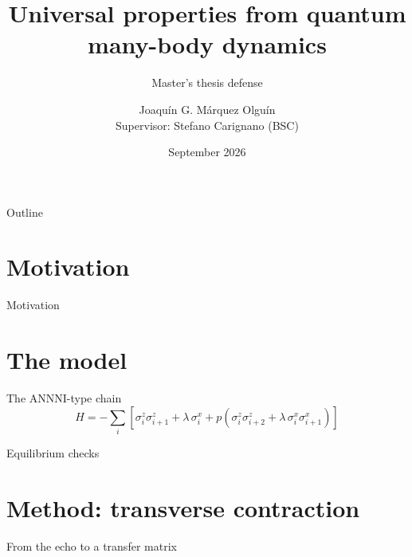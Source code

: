 \documentclass[aspectratio=169, 10pt]{beamer}
\title[Universal properties from dynamics]{Universal properties from quantum many-body dynamics}
\subtitle{Master's thesis defense}
\author[J. G. Márquez Olguín]{Joaquín G. Márquez Olguín \\[1ex] {\small Supervisor: Stefano Carignano (BSC)}}
\institute[]{Barcelona Supercomputing Center}
\date{September 2026}
\begin{document}
\begin{frame}
  \titlepage
\end{frame}

\begin{frame}{Outline}
  \tableofcontents
\end{frame}

\section{Motivation}

\begin{frame}{Motivation}
\end{frame}

\section{The model}

\begin{frame}{The ANNNI-type chain}
  \begin{equation*}
    H = -\sum_i\left[\sigma^z_i\sigma^z_{i+1} + \lambda\,\sigma^x_i
        + p\left(\sigma^z_i\sigma^z_{i+2} + \lambda\,\sigma^x_i\sigma^x_{i+1}\right)\right]
  \end{equation*}
\end{frame}

\begin{frame}{Equilibrium checks}
\end{frame}

\section{Method: transverse contraction}

\begin{frame}{From the echo to a transfer matrix}
\end{frame}
\end{document}
